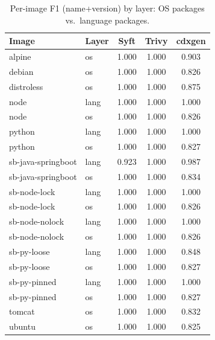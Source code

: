 \begin{table}[t]\centering\caption{Per-image F1 (name+version) by layer: OS packages vs.\ language packages.}\label{tab:perimage}
\scriptsize\begin{tabular}{llccc}\toprule
Image & Layer & Syft & Trivy & cdxgen \\\midrule
alpine & os & 1.000 & 1.000 & 0.903 \\
debian & os & 1.000 & 1.000 & 0.826 \\
distroless & os & 1.000 & 1.000 & 0.875 \\
node & lang & 1.000 & 1.000 & 1.000 \\
node & os & 1.000 & 1.000 & 0.826 \\
python & lang & 1.000 & 1.000 & 1.000 \\
python & os & 1.000 & 1.000 & 0.827 \\
sb-java-springboot & lang & 0.923 & 1.000 & 0.987 \\
sb-java-springboot & os & 1.000 & 1.000 & 0.834 \\
sb-node-lock & lang & 1.000 & 1.000 & 1.000 \\
sb-node-lock & os & 1.000 & 1.000 & 0.826 \\
sb-node-nolock & lang & 1.000 & 1.000 & 1.000 \\
sb-node-nolock & os & 1.000 & 1.000 & 0.826 \\
sb-py-loose & lang & 1.000 & 1.000 & 0.848 \\
sb-py-loose & os & 1.000 & 1.000 & 0.827 \\
sb-py-pinned & lang & 1.000 & 1.000 & 1.000 \\
sb-py-pinned & os & 1.000 & 1.000 & 0.827 \\
tomcat & os & 1.000 & 1.000 & 0.832 \\
ubuntu & os & 1.000 & 1.000 & 0.825 \\
\bottomrule\end{tabular}\end{table}
